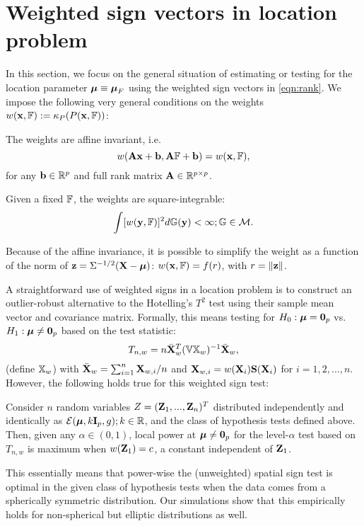 \section{Weighted sign vectors in location problem}
\label{section:LocSection}
In this section, we focus on the general situation of estimating or testing for the location parameter ${\boldsymbol{\mu}} \equiv {\boldsymbol{\mu}}_F$ using the weighted sign vectors in \eqref{eqn:rank}. We impose the following very general conditions on the weights $w({\bf{x}}, {\mathbb{F}}) := \kappa_P(P({\bf{x}}, {\mathbb{F}}))$:

\vspace{1em}
 The weights are affine invariant, i.e.
%
$$
w({\mathbf{A}} {\bf{x}} + {\bf{b}}, {\mathbf{A}} {\mathbb{F}} + {\bf{b}}) = w({\bf{x}}, {\mathbb{F}}),
$$
%
for any ${\bf{b}} \in {\mathbb{R}}^p$ and full rank matrix ${\mathbf{A}} \in {\mathbb{R}}^{p \times p}$.

 Given a fixed ${\mathbb{F}}$, the weights are square-integrable:
%
$$
\int [w({\bf{y}}, {\mathbb{F}})]^2 d{\mathbb{G}}({\bf{y}}) < \infty; {\mathbb{G}} \in \mathcal{M}.
$$

\vspace{1em}
\noindent Because of the affine invariance, it is possible to simplify the weight as a function of the norm of ${\bf{z}} = \Sigma^{-1/2} ({\mathbf{X}} - {\boldsymbol{\mu}})$: $w({\bf{x}}, {\mathbb{F}}) = f(r)$, with $r = \| {\bf{z}} \|$.

A straightforward use of weighted signs in a location problem is to construct an outlier-robust alternative to the Hotelling's $T^2$ test using their sample mean vector and covariance matrix. Formally, this means testing for $H_0: {\boldsymbol{\mu}} = {\bf 0}_p$ vs. $H_1:{\boldsymbol{\mu}} \neq {\bf 0}_p$  based on the test statistic:
%
$$
T_{n,w} = n \bar{{\mathbf{X}}}_w^T ( {\mathbb{V}} {\mathbb{X}}_w)^{-1} \bar{{\mathbf{X}}}_w,
$$
%
({\colrbf define ${\mathbb{X}}_w$}) with $\bar{{\mathbf{X}}}_w = \sum_{i=1}^n {\mathbf{X}}_{w,i}/n$ and ${\mathbf{X}}_{w,i} = w({\mathbf{X}}_i ) {\mathbf{S}} ({\mathbf{X}}_i)$ for $i=1,2,...,n$. However, the following holds true for this weighted sign test:
%
\begin{Proposition}\label{proposition:SignTest}
Consider $n$ random variables $Z = ({\mathbf{Z}}_1,...,{\mathbf{Z}}_n)^T$ distributed independently and identically as $\mathcal{E}( {\boldsymbol{\mu}}, k {\mathbf{I}}_p, g); k \in \mathbb R$, and the class of hypothesis tests defined above. Then, given any $\alpha \in (0,1)$, local power at ${\boldsymbol{\mu}} \neq {\bf 0}_p$ for the level-$\alpha$ test  based on $T_{n,w}$ is maximum when $w({\mathbf{Z}}_1) = c$, a constant independent of ${\mathbf{Z}}_1$.
\end{Proposition}
%
\noindent This essentially means that power-wise the (unweighted) spatial sign test \citep{OjaBook10} is optimal in the given class of hypothesis tests when the data comes from a spherically symmetric distribution. Our simulations show that this empirically holds for non-spherical but elliptic distributions as well.

